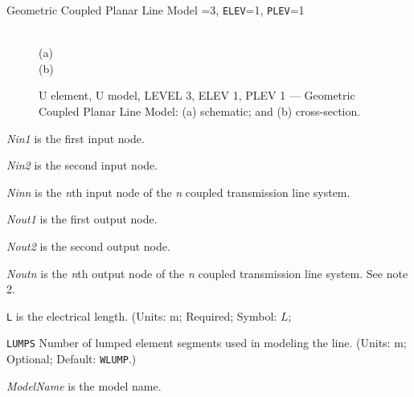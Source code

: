 %
%
{\parbox[t]{3in}{Geometric Coupled Planar Line Model
                 =3, {\tt ELEV}=1, {\tt PLEV}=1
}}
\label{U3.1.1model}

\begin{figure}[h]
\centering
\ \epsfxsize=2in\\
(a)\\
\vspace*{2in}
(b)\\
\caption{U element, U model, LEVEL 3, ELEV 1, PLEV 1 ---
Geometric Coupled Planar Line Model: (a) schematic; and (b) cross-section.}
\end{figure}



\begin{widelist}
\item[{\it Nin1}] is the first input node.
\item[{\it Nin2}] is the second input node.
\item[{\it Ninn}] is the {\it n}th input node of the {\it n} coupled
                  transmission line system.
\item[{\it Nout1}] is the first output node.
\item[{\it Nout2}] is the second output node.
\item[{\it Noutn}] is the {\it n}th output node of the {\it n} coupled
                  transmission line system.
                See note 2.
\end{widelist}

\begin{widelist}
\item[{\tt L}]	 is the electrical length.
                (Units: m; Required; Symbol: $L$;
\item[{\tt LUMPS}]	Number of lumped element segments used in modeling
                the line.
                (Units: m; Optional; Default: {\tt WLUMP}.)
\item[{\it ModelName}]  is  the  model name.
\end{widelist}



